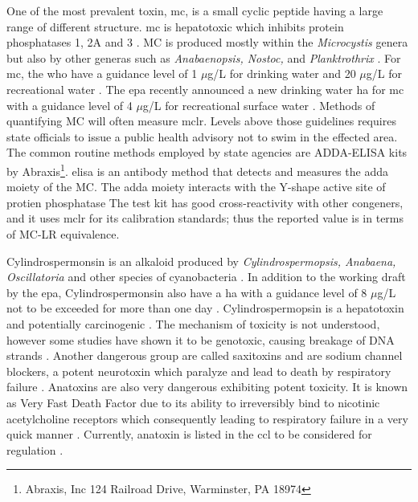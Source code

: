 One of the most prevalent toxin, \gls{mc}, is a small cyclic peptide having a large range of different structure. \gls{mc} is hepatotoxic which inhibits protein phosphatases 1, 2A and 3 \cite{moore_richard_cyanobacterial_1993}. MC is produced mostly within the \emph{Microcystis} genera but also by other generas such as \emph{Anabaenopsis,  Nostoc,} and \emph{Planktrothrix} \cite{rastogi_cyanotoxin-microcystins:_2014, davis_phylogenies_2014}. For \gls{mc}, the \gls{who} have a guidance level of 1 $\mu$g/L for drinking water and 20 $\mu$g/L for recreational water \cite{noauthor_guidelines_1998,noauthor_guidelines_2003}. The \gls{epa} recently announced a new drinking water \gls{ha} for \gls{mc} with a guidance level of 4 $\mu$g/L for recreational surface water \cite{usepa_draft_2016}. Methods of quantifying MC will often measure \gls{mclr}. Levels above those guidelines requires state officials to issue a public health advisory not to swim in the effected area.  The common routine methods employed by state agencies are ADDA-ELISA kits by Abraxis\footnote{Abraxis, Inc 124 Railroad Drive, Warminster, PA 18974}. \gls{elisa} is an antibody method that detects and measures the \gls{adda} moiety of the MC. The \gls{adda} moiety interacts with the Y-shape active site of protien phosphatase \cite{pereira_computational_2013} The test kit has good cross-reactivity with other congeners, and it uses \gls{mclr} for its calibration standards; thus the reported value is in terms of MC-LR equivalence. 

Cylindrospermonsin is an alkaloid produced by \emph{Cylindrospermopsis, Anabaena, Oscillatoria} and other species of cyanobacteria \cite{dittmann_cyanobacterial_2012}. In addition to the working draft by the \gls{epa}, Cylindrospermonsin also have a \gls{ha} with a guidance level of 8 $\mu$g/L not to be exceeded for more than one day \cite{usepa_draft_2016}. Cylindrospermopsin is a hepatotoxin and potentially carcinogenic \cite{moreira_cylindrospermopsin:_2013}. The mechanism of toxicity is not understood, however some studies have shown it to be genotoxic, causing breakage of DNA strands \cite{alja_double_2013,kittler_1._2014}. Another dangerous group are called saxitoxins and are sodium channel blockers, a potent neurotoxin which paralyze and lead to death by respiratory failure \cite{moore_richard_cyanobacterial_1993}.  Anatoxins are also very dangerous exhibiting potent toxicity. It is known as Very Fast Death Factor due to its ability to irreversibly bind to nicotinic acetylcholine receptors which consequently leading to respiratory failure in a very quick manner \cite{codd_cyanobacterial_1999, moore_richard_cyanobacterial_1993}. Currently, anatoxin is listed in the \gls{ccl} to be considered for regulation \cite{usepa_drinking_2016}. 

